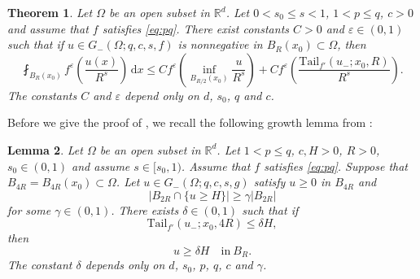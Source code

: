 \documentclass[11pt]{amsart}
\theoremstyle{plain}
\newtheorem{theorem}{Theorem}[section]
\newtheorem{lemma}[theorem]{Lemma}
\theoremstyle{definition}
\numberwithin{equation}{section}
\newcommand{\Rd}{\mathbb{R}^d}
\begin{document}
\begin{theorem} \label{thm:inf}
Let $\Omega$ be an open subset in $\Rd$. Let $0 < s_0 \leq s < 1$, $1<p \leq q$, $c > 0$ and assume that $f$ satisfies \eqref{eq:pq}. There exist constants $C > 0$ and $\varepsilon \in (0,1)$ such that if $u \in G_-(\Omega; q, c, s, f)$ is nonnegative in $B_{R}(x_0) \subset \Omega$, then
\begin{equation*}
\fint_{B_{R}(x_0)} f^{\varepsilon}\left( \frac{u(x)}{R^s} \right) \,\mathrm{d}x \leq C f^{\varepsilon} \left( \inf_{B_{R/2}(x_0)} \frac{u}{R^s} \right) + C f^{\varepsilon} \left( \frac{\mathrm{Tail}_{f'}(u_-; x_0, R)}{R^s} \right).
\end{equation*}
The constants $C$ and $\varepsilon$ depend only on $d$, $s_0$, $q$ and $c$.
\end{theorem}

Before we give the proof of , we recall the following growth lemma from \cite{ChKiWe21}:

\begin{lemma} \cite[Theorem 4.1]{ChKiWe21}
\label{lem:growth}
Let $\Omega$ be an open subset in $\Rd$. Let $1<p\leq q$, $c, H > 0$, $R>0$, $s_0\in(0,1)$ and assume $s \in [s_0,1)$. Assume that $f$ satisfies \eqref{eq:pq}. Suppose that $B_{4R} = B_{4R}(x_0) \subset \Omega$. Let $u \in G_-(\Omega; q, c, s, g)$ satisfy $u \ge 0$ in $B_{4R}$ and
\begin{equation*}
|B_{2R} \cap \lbrace u \geq H \rbrace| \geq \gamma |B_{2R}|
\end{equation*}
for some $\gamma \in (0,1)$. There exists $\delta \in (0,1)$ such that if
\begin{equation*}
\mathrm{Tail}_{f'}(u_-; x_0, 4R) \leq \delta H,
\end{equation*}
then
\begin{equation*}
u \geq \delta H \quad\text{in}~ B_{R}.
\end{equation*}
The constant $\delta$ depends only on $d$, $s_0$, $p$, $q$, $c$ and $\gamma$.
\end{lemma}
\end{document}
